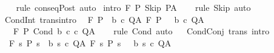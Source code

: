 \begin{isabellebody}
%
\isadelimproof
\ \ %
\endisadelimproof
%
\isatagproof
{}\isamarkupfalse%
\ {\isacharparenleft}rule\ conseqPost{\isacharparenright}\ auto%
\endisatagproof
{\isafoldproof}%
%
\isadelimproof
\isanewline
%
\endisadelimproof
\isanewline
{}\isamarkupfalse%
\ {\isacharbrackleft}intro{\isacharquery}{\isacharbrackright}{\isacharcolon}\ {\isachardoublequoteopen}{\isasymGamma}{\isacharcomma}{\isasymTheta}{\isasymturnstile}\isactrlbsub {\isacharslash}F\isactrlesub \ P\ Skip\ P{\isacharcomma}A{\isachardoublequoteclose}\isanewline
%
\isadelimproof
\ \ %
\endisadelimproof
%
\isatagproof
{}\isamarkupfalse%
\ {\isacharparenleft}rule\ Skip{\isacharparenright}\ auto%
\endisatagproof
{\isafoldproof}%
%
\isadelimproof
\isanewline
%
\endisadelimproof
\isanewline
{}\isamarkupfalse%
\ CondInt\ {\isacharbrackleft}trans{\isacharcomma}intro{\isacharquery}{\isacharbrackright}{\isacharcolon}\isanewline
\ \ {\isachardoublequoteopen}{\isasymlbrakk}{\isasymGamma}{\isacharcomma}{\isasymTheta}{\isasymturnstile}\isactrlbsub {\isacharslash}F\isactrlesub \ {\isacharparenleft}P\ {\isasyminter}\ b{\isacharparenright}\ c{}\ Q{\isacharcomma}A{\isacharsemicolon}\ {\isasymGamma}{\isacharcomma}{\isasymTheta}{\isasymturnstile}\isactrlbsub {\isacharslash}F\isactrlesub \ {\isacharparenleft}P\ {\isasyminter}\ {\isacharminus}\ b{\isacharparenright}\ c{}\ Q{\isacharcomma}A{\isasymrbrakk}\isanewline
\ \ \ {\isasymLongrightarrow}\isanewline
\ \ \ {\isasymGamma}{\isacharcomma}{\isasymTheta}{\isasymturnstile}\isactrlbsub {\isacharslash}F\isactrlesub \ P\ {\isacharparenleft}Cond\ b\ c{}\ c{}{\isacharparenright}\ Q{\isacharcomma}A{\isachardoublequoteclose}\isanewline
%
\isadelimproof
\ \ %
\endisadelimproof
%
\isatagproof
{}\isamarkupfalse%
\ {\isacharparenleft}rule\ Cond{\isacharparenright}\ auto%
\endisatagproof
{\isafoldproof}%
%
\isadelimproof
\isanewline
%
\endisadelimproof
\ \isanewline
{}\isamarkupfalse%
\ CondConj\ {\isacharbrackleft}trans{\isacharcomma}\ intro{\isacharquery}{\isacharbrackright}{\isacharcolon}\isanewline
\ \ {\isachardoublequoteopen}{\isasymlbrakk}{\isasymGamma}{\isacharcomma}{\isasymTheta}{\isasymturnstile}\isactrlbsub {\isacharslash}F\isactrlesub \ {\isacharbraceleft}s{\isachardot}\ P\ s\ {\isasymand}\ b\ s{\isacharbraceright}\ c{}\ Q{\isacharcomma}A{\isacharsemicolon}\ {\isasymGamma}{\isacharcomma}{\isasymTheta}{\isasymturnstile}\isactrlbsub {\isacharslash}F\isactrlesub \ {\isacharbraceleft}s{\isachardot}\ P\ s\ {\isasymand}\ {\isasymnot}\ b\ s{\isacharbraceright}\ c{}\ Q{\isacharcomma}A{\isasymrbrakk}\isanewline

\end{isabellebody}

